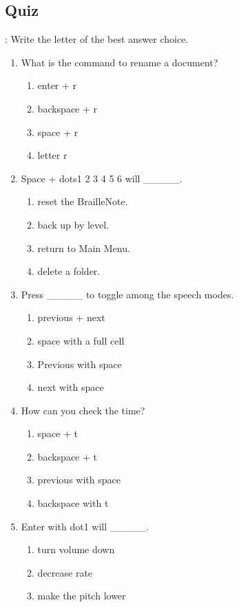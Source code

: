 \documentclass[10pt,letterpaper,twoside]{report}
\begin{document}
{\subsection{Quiz}:
Write the letter of the best answer choice.
\begin{enumerate}
	\item What is the command to rename a document?
	      \begin{enumerate}
		      \item enter + r
		      \item backspace + r
		      \item space + r
		      \item letter r
	      \end{enumerate}
	\item Space + dots1 2 3 4 5 6 will \_\_\_\_\_.
	      \begin{enumerate}
		      \item reset the BrailleNote.
		      \item back up by level.
		      \item return to Main Menu.
		      \item delete a folder.
	      \end{enumerate}
	\item Press \_\_\_\_\_ to toggle among the speech modes.
	      \begin{enumerate}
		      \item previous + next
		      \item space with a full cell
		      \item Previous with space
		      \item next with space
	      \end{enumerate}
	\item How can you check the time?
	      \begin{enumerate}
		      \item space + t
		      \item backspace + t
		      \item previous with space
		      \item backspace with t
	      \end{enumerate}
	\item Enter with dot1 will \_\_\_\_\_.
	      \begin{enumerate}
		      \item turn volume down
		      \item decrease rate
		      \item make the pitch lower

\end{enumerate}
\end{enumerate}}
\end{document}
